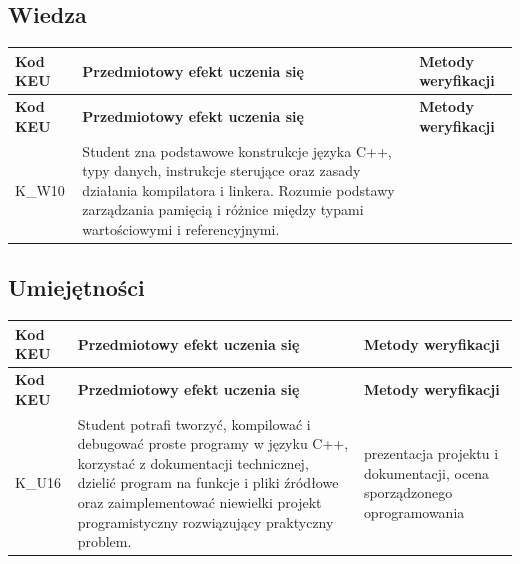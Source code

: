 \documentclass[12pt, a4paper]{article}
\newcommand{\thdrule}{\noalign{\global\setlength{\extrarowheight}{0pt}}}
\newcommand{\thdend}{\noalign{\global\setlength{\extrarowheight}{3pt}}}
\begin{document}
\subsection*{Wiedza}
{\scriptsize
\begin{longtable}{m{1.6cm}m{9.0cm}m{4.2cm}}
\thdrule\toprule
\rowcolor{pjatkRed} {\color{white}\footnotesize\textbf{\vphantom{Ag}Kod KEU}} & {\color{white}\footnotesize\textbf{\vphantom{Ag}Przedmiotowy efekt uczenia się}} & {\color{white}\footnotesize\textbf{\vphantom{Ag}Metody weryfikacji}} \\
\midrule\thdend
\endfirsthead
\thdrule\toprule
\rowcolor{pjatkRed} {\color{white}\footnotesize\textbf{\vphantom{Ag}Kod KEU}} & {\color{white}\footnotesize\textbf{\vphantom{Ag}Przedmiotowy efekt uczenia się}} & {\color{white}\footnotesize\textbf{\vphantom{Ag}Metody weryfikacji}} \\
\midrule\thdend
\endhead
  \rowcolor{tableRowLight} K\_W10 & Student zna podstawowe konstrukcje języka C++, typy danych, instrukcje sterujące oraz zasady działania kompilatora i linkera. Rozumie podstawy zarządzania pamięcią i różnice między typami wartościowymi i referencyjnymi. &  \\
\bottomrule
\end{longtable}}

\subsection*{Umiejętności}
{\scriptsize
\begin{longtable}{m{1.6cm}m{9.0cm}m{4.2cm}}
\thdrule\toprule
\rowcolor{pjatkRed} {\color{white}\footnotesize\textbf{\vphantom{Ag}Kod KEU}} & {\color{white}\footnotesize\textbf{\vphantom{Ag}Przedmiotowy efekt uczenia się}} & {\color{white}\footnotesize\textbf{\vphantom{Ag}Metody weryfikacji}} \\
\midrule\thdend
\endfirsthead
\thdrule\toprule
\rowcolor{pjatkRed} {\color{white}\footnotesize\textbf{\vphantom{Ag}Kod KEU}} & {\color{white}\footnotesize\textbf{\vphantom{Ag}Przedmiotowy efekt uczenia się}} & {\color{white}\footnotesize\textbf{\vphantom{Ag}Metody weryfikacji}} \\
\midrule\thdend
\endhead
  \rowcolor{tableRowLight} K\_U16 & Student potrafi tworzyć, kompilować i debugować proste programy w języku C++, korzystać z dokumentacji technicznej, dzielić program na funkcje i pliki źródłowe oraz zaimplementować niewielki projekt programistyczny rozwiązujący praktyczny problem. & prezentacja projektu i dokumentacji, ocena sporządzonego oprogramowania \\
\bottomrule
\end{longtable}}
\end{document}

